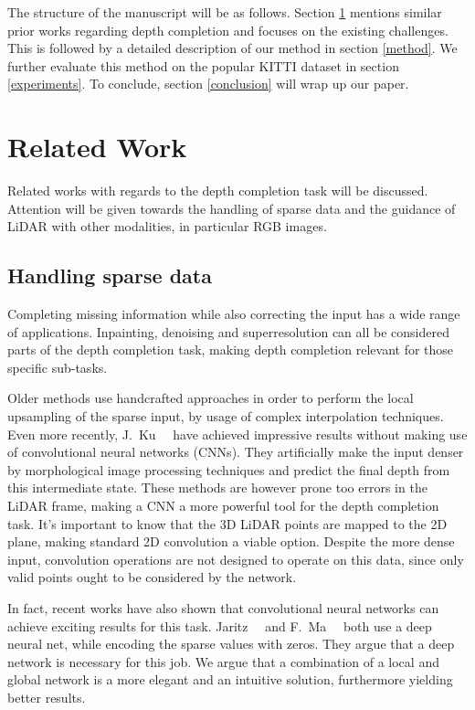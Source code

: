 \documentclass{main_style}
\begin{document}
The structure of the manuscript will be as follows. Section \ref{related_work} mentions similar prior works regarding depth completion and focuses on the existing challenges. This is followed by a detailed description of our method in section \ref{method}. We further evaluate this method on the popular KITTI dataset in section \ref{experiments}. To conclude, section \ref{conclusion} will wrap up our paper.

\section{Related Work} \label{related_work}
Related works with regards to the depth completion task will be discussed. Attention will be given towards the handling of sparse data and the guidance of LiDAR with other modalities, in particular RGB images.
\subsection{Handling sparse data} 
Completing missing information while also correcting the input has a wide range of applications. Inpainting, denoising and superresolution can all be considered parts of the depth completion task, making depth completion relevant for those specific sub-tasks.

Older methods use handcrafted approaches in order to perform the local upsampling of the sparse input, by usage of complex interpolation techniques. Even more recently, J.~Ku~\etal~\cite{ip_basic} have achieved impressive results without making use of convolutional neural networks (CNNs). They artificially make the input denser by morphological image processing techniques and predict the final depth from this intermediate state. These methods are however prone too errors in the LiDAR frame, making a CNN a more powerful tool for the depth completion task. It's important to know that the 3D LiDAR points are mapped to the 2D plane, making standard 2D convolution a viable option. Despite the more dense input, convolution operations are not designed to operate on this data, since only valid points ought to be considered by the network.

In fact, recent works have also shown that convolutional neural networks can achieve exciting results for this task. Jaritz~\etal~\cite{jaritz} and F.~Ma~\etal~\cite{sparsetodense} both use a deep neural net, while encoding the sparse values with zeros. They argue that a deep network is necessary for this job. We argue that a combination of a local and global network is a more elegant and an intuitive solution, furthermore yielding better results.
\end{document}
